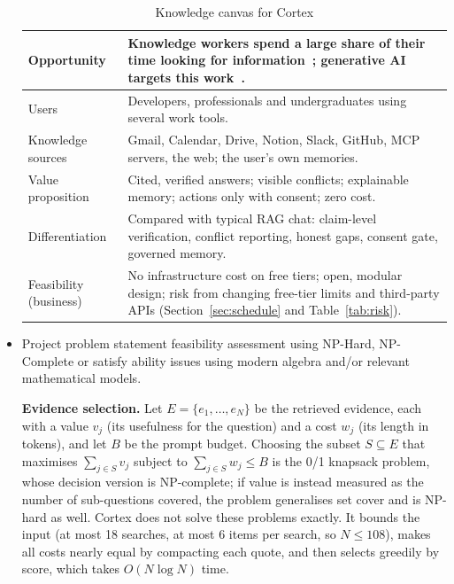 \documentclass[oneside,a4paper,12pt]{report}
\begin{document}
\begin{appendices}
\begin{itemize}
\begin{table}[!htbp]
\begin{center}
\def\arraystretch{1.3}
\small
\begin{tabularx}{\textwidth}{| p{3.2cm} | X |}
\hline
Opportunity & Knowledge workers spend a large share of their time looking for information~\cite{mckinseyweb}; generative AI targets this work~\cite{mckinsey}. \\ \hline
Users & Developers, professionals and undergraduates using several work tools. \\ \hline
Knowledge sources & Gmail, Calendar, Drive, Notion, Slack, GitHub, MCP servers, the web; the user's own memories. \\ \hline
Value proposition & Cited, verified answers; visible conflicts; explainable memory; actions only with consent; zero cost. \\ \hline
Differentiation & Compared with typical RAG chat: claim-level verification, conflict reporting, honest gaps, consent gate, governed memory. \\ \hline
Feasibility (business) & No infrastructure cost on free tiers; open, modular design; risk from changing free-tier limits and third-party APIs (Section~\ref{sec:schedule} and Table~\ref{tab:risk}). \\ \hline
\end{tabularx}
\end{center}
\caption{Knowledge canvas for Cortex}
\label{tab:canvas}
\end{table}

\item Project problem statement feasibility assessment using NP-Hard, NP-Complete or satisfy ability issues using modern algebra and/or relevant mathematical models.

\textbf{Evidence selection.} Let $E = \{e_1, \ldots, e_N\}$ be the retrieved evidence, each with a value $v_j$ (its usefulness for the question) and a cost $w_j$ (its length in tokens), and let $B$ be the prompt budget. Choosing the subset $S \subseteq E$ that maximises $\sum_{j \in S} v_j$ subject to $\sum_{j \in S} w_j \le B$ is the 0/1 knapsack problem, whose decision version is NP-complete; if value is instead measured as the number of sub-questions covered, the problem generalises set cover and is NP-hard as well. Cortex does not solve these problems exactly. It bounds the input (at most 18 searches, at most 6 items per search, so $N \le 108$), makes all costs nearly equal by compacting each quote, and then selects greedily by score, which takes $O(N \log N)$ time.


\end{itemize}
\end{appendices}
\end{document}
